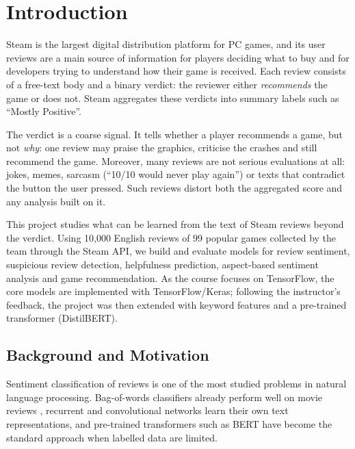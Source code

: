 \chapter{Introduction}
\label{chap:introduction}

Steam is the largest digital distribution platform for PC games, and its user reviews are a main source of information for players deciding what to buy and for developers trying to understand how their game is received. Each review consists of a free-text body and a binary verdict: the reviewer either \textit{recommends} the game or does not. Steam aggregates these verdicts into summary labels such as ``Mostly Positive''.

The verdict is a coarse signal. It tells whether a player recommends a game, but not \textit{why}: one review may praise the graphics, criticise the crashes and still recommend the game. Moreover, many reviews are not serious evaluations at all: jokes, memes, sarcasm (``10/10 would never play again'') or texts that contradict the button the user pressed. Such reviews distort both the aggregated score and any analysis built on it.

This project studies what can be learned from the text of Steam reviews beyond the verdict. Using 10,000 English reviews of 99 popular games collected by the team through the Steam API, we build and evaluate models for review sentiment, suspicious review detection, helpfulness prediction, aspect-based sentiment analysis and game recommendation. As the course focuses on TensorFlow, the core models are implemented with TensorFlow/Keras; following the instructor's feedback, the project was then extended with keyword features and a pre-trained transformer (DistilBERT).

\section{Background and Motivation}

Sentiment classification of reviews is one of the most studied problems in natural language processing. Bag-of-words classifiers already perform well on movie reviews \cite{Pang2002}, recurrent \cite{Hochreiter1997} and convolutional \cite{Kim2014} networks learn their own text representations, and pre-trained transformers such as BERT \cite{Devlin2019} have become the standard approach when labelled data are limited.

